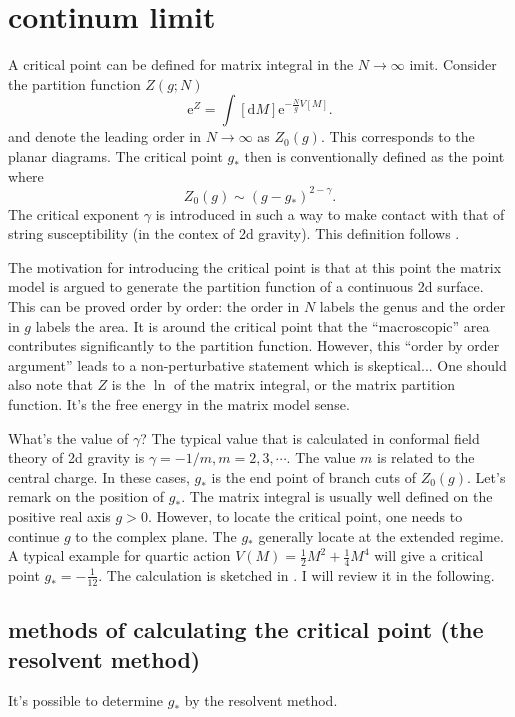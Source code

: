 \section{continum limit}
\marginpar{\today}
A critical point can be defined for matrix integral in the $N\to\infty$ imit. 
Consider the partition function $Z(g;N)$ 
\begin{equation}
	\mathrm{e}^{Z} = \int [\mathrm{d}M] \mathrm{e}^{-\frac{N}{g}V[M]}
.\end{equation}
and denote the leading order in $N\to\infty$ as $Z_0(g)$. 
This corresponds to the planar diagrams.
The critical point $g_*$ then is conventionally defined as the point where
\[
Z_0(g)\sim (g-g_*)^{2-\gamma}
.\]
The critical exponent $\gamma$ is introduced in such a way to make contact with that of string susceptibility (in the contex of 2d gravity).
This definition follows
.

The motivation for introducing the critical point is that
at this point the matrix model is argued to generate the partition function of a continuous 2d surface.
This can be proved order by order:
the order in $N$ labels the genus and the order in $g$ labels the area.
It is around the critical point that the ``macroscopic'' area contributes significantly to the partition function.
However, this ``order by order argument'' leads to a non-perturbative statement which is skeptical...
One should also note that $Z$ is the $\ln$ of the matrix integral, or the matrix partition function.
It's the free energy in the matrix model sense.

What's the value of $\gamma$? The typical value that is calculated in conformal field theory of 2d gravity is $\gamma = -1 / m, m=2,3,\cdots$.
The value $m$ is related to the central charge.
In these cases, $g_*$ is the end point of branch cuts of $Z_0(g)$.
Let's remark on the position of $g_*$.
The matrix integral is usually well defined on the positive real axis $g>0$.
However, to locate the critical point,
one needs to continue $g$ to the complex plane.
The $g_*$ generally locate at the extended regime.
A typical example for quartic action $V(M)=\frac{1}{2}M^2 + \frac{1}{4}M^4$ will give a critical point $g_*=-\frac{1}{12}$.
The calculation is sketched in
.
I will review it in the following.

\subsection{methods of calculating the critical point (the resolvent method)}
It's possible to determine $g_*$ by the resolvent method.


